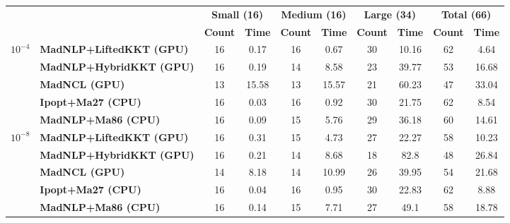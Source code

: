 \begin{center}
\renewcommand{\arraystretch}{0.9}
\begin{tabular}{|l|l|cc|cc|cc|cc|}
\hline
 & & \multicolumn{2}{c|}{\textbf{Small (16)}} & \multicolumn{2}{c|}{\textbf{Medium (16)}} & \multicolumn{2}{c|}{\textbf{Large (34)}} & \multicolumn{2}{c|}{\textbf{Total (66)}} \\
 & & \textbf{Count} & \textbf{Time} & \textbf{Count} & \textbf{Time} & \textbf{Count} & \textbf{Time} & \textbf{Count} & \textbf{Time} \\
\hline
\multirow{5}{*}{\Large\textbf{$10^{-4}$}} & \textbf{MadNLP+LiftedKKT (GPU)} & \cellcolor{blue!15}16 & 0.17 & \cellcolor{blue!15}16 & \cellcolor{blue!15}0.67 & \cellcolor{blue!15}30 & \cellcolor{blue!15}10.16 & \cellcolor{blue!15}62 & \cellcolor{blue!15}4.64 \\
 & \textbf{MadNLP+HybridKKT (GPU)} & \cellcolor{blue!15}16 & 0.19 & 14 & 8.58 & 23 & 39.77 & 53 & 16.68 \\
 & \textbf{MadNCL (GPU)} & 13 & 15.58 & 13 & 15.57 & 21 & 60.23 & 47 & 33.04 \\
 & \textbf{Ipopt+Ma27 (CPU)} & \cellcolor{blue!15}16 & \cellcolor{blue!15}0.03 & \cellcolor{blue!15}16 & 0.92 & \cellcolor{blue!15}30 & 21.75 & \cellcolor{blue!15}62 & 8.54 \\
 & \textbf{MadNLP+Ma86 (CPU)} & \cellcolor{blue!15}16 & 0.09 & 15 & 5.76 & 29 & 36.18 & 60 & 14.61 \\
\hline
\multirow{5}{*}{\Large\textbf{$10^{-8}$}} & \textbf{MadNLP+LiftedKKT (GPU)} & \cellcolor{blue!15}16 & 0.31 & 15 & 4.73 & 27 & \cellcolor{blue!15}22.27 & 58 & 10.23 \\
 & \textbf{MadNLP+HybridKKT (GPU)} & \cellcolor{blue!15}16 & 0.21 & 14 & 8.68 & 18 & 82.8 & 48 & 26.84 \\
 & \textbf{MadNCL (GPU)} & 14 & 8.18 & 14 & 10.99 & 26 & 39.95 & 54 & 21.68 \\
 & \textbf{Ipopt+Ma27 (CPU)} & \cellcolor{blue!15}16 & \cellcolor{blue!15}0.04 & \cellcolor{blue!15}16 & \cellcolor{blue!15}0.95 & \cellcolor{blue!15}30 & 22.83 & \cellcolor{blue!15}62 & \cellcolor{blue!15}8.88 \\
 & \textbf{MadNLP+Ma86 (CPU)} & \cellcolor{blue!15}16 & 0.14 & 15 & 7.71 & 27 & 49.1 & 58 & 18.78 \\
\hline
\end{tabular}
\end{center}
